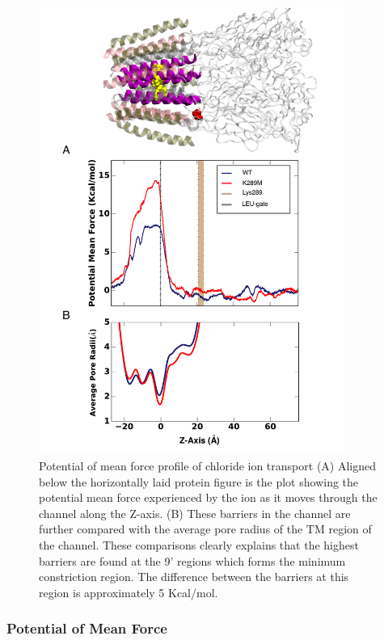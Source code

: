 \documentclass[12pt,onecolumn]{biophys}
\begin{document}
\begin{figure}
\begin{center}
\includegraphics[width = 100mm]{figures/ABF_pic_2.pdf}
\caption{ Potential of mean force profile of chloride ion transport  (A) Aligned below the horizontally laid protein figure is the plot showing the potential mean force experienced by the ion as it moves through the channel along the Z-axis. (B) These barriers in the channel are further compared with the average pore radius of the TM region of the channel. These comparisons clearly explains that the highest barriers are found at the 9' regions which forms the minimum constriction region. The difference between the barriers at this region is approximately 5 Kcal/mol.}
\label{fig:abf}
\end{center}
\end{figure}

\subsubsection*{Potential of Mean Force}
\end{document}
